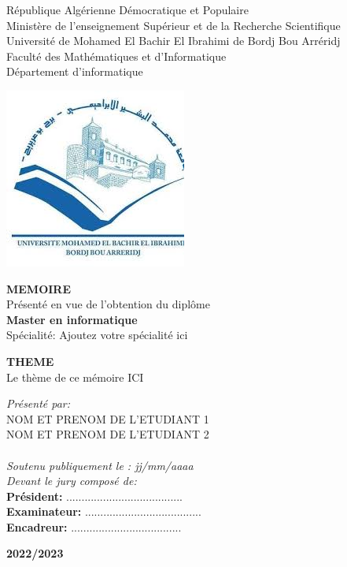 
\thispagestyle{empty}
\begin{center}
\begin{spacing}{1.15}
République Algérienne Démocratique et Populaire \\
Ministère de l’enseignement Supérieur et de la Recherche Scientifique \\
Université de Mohamed El Bachir El Ibrahimi de Bordj Bou Arréridj\\
Faculté des Mathématiques et d’Informatique\\
Département d'informatique\\
\vspace{0.5cm}

\includegraphics[scale=0.5]{Images/logo.jpeg}

\vspace{0.5cm}

\fontsize{13}{15}\selectfont \textbf{MEMOIRE}\\
Présenté en vue de l’obtention du diplôme \\
\fontsize{13}{15}\selectfont \textbf{Master en informatique} \\
Spécialité: Ajoutez votre spécialité ici 

\vspace{1.5cm}

\fontsize{19}{22}\selectfont \textbf{THEME} \\
\fontsize{19}{22}\selectfont Le thème de ce mémoire ICI
\end{spacing}
\end{center}

\vspace{0.5cm}

\begin{spacing}{1.5}
\noindent
\textit{Présenté par:} \\
NOM ET PRENOM DE L'ETUDIANT 1 \\
NOM ET PRENOM DE L'ETUDIANT 2 \\
~~\\
\textit{Soutenu publiquement le : jj/mm/aaaa} \\
\textit{Devant le jury composé de:} \\
\textbf{Président:} ...................................... \\
\textbf{Examinateur:} ...................................... \\
\textbf{Encadreur:} .................................... \\
\end{spacing}


\centerline{\textbf{2022/2023}}

